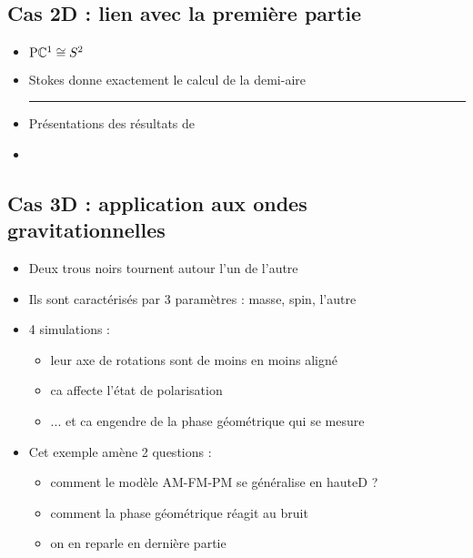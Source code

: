 \subsection{\todo Cas 2D : lien avec la première partie} \label{subsec:ex-2D}

\begin{itemize}
	
	\item $\text{\normalfont P}\mathbb{C}^{1} \cong S^2$
	
	\item Stokes donne exactement le calcul de la demi-aire \\
	
	\hrule
	
	\item Présentations des résultats de \cite{le_bihan_modephysiques_2023}
	
	\item {}
	
\end{itemize}



\subsection{\todo Cas 3D : application aux ondes gravitationnelles} \label{subsec:ex-3D}

\begin{itemize}
	
	\item Deux trous noirs tournent autour l'un de l'autre
	
	\item Ils sont caractérisés par 3 paramètres : masse, spin, l'autre
	
	\item 4 simulations : \begin{itemize}
		
		\item leur axe de rotations sont de moins en moins aligné
		
		\item ca affecte l'état de polarisation 
		
		\item ... et ca engendre de la phase géométrique qui se mesure
	\end{itemize}
	
	\item Cet exemple amène 2 questions : \begin{itemize}
		
		\item comment le modèle AM-FM-PM se généralise en hauteD ?
		
		\item comment la phase géométrique réagit au bruit
		
		\item on en reparle en dernière partie

	\end{itemize}
\end{itemize}

